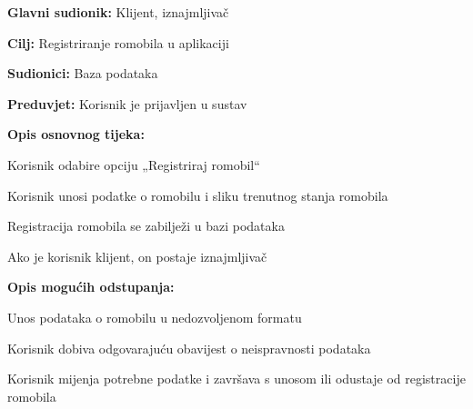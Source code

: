 						\noindent {}
						\begin{packed_item}
							
							\item \textbf{Glavni sudionik: }Klijent, iznajmljivač
							\item  \textbf{Cilj: }Registriranje romobila u aplikaciji
							\item  \textbf{Sudionici: }Baza podataka
							\item  \textbf{Preduvjet: }Korisnik je prijavljen u sustav
							\item  \textbf{Opis osnovnog tijeka:}
							
							\item[] \begin{packed_enum}
								
								\item Korisnik odabire opciju „Registriraj romobil“ 
								\item Korisnik unosi podatke o romobilu i sliku trenutnog stanja romobila 
								\item Registracija romobila se zabilježi u bazi podataka 
								\item Ako je korisnik klijent, on postaje iznajmljivač   
							\end{packed_enum}
							
							\item  \textbf{Opis mogućih odstupanja:}
							
							\item[] \begin{packed_item}
								
								\item[2.a] Unos podataka o romobilu u nedozvoljenom formatu 
								\item[] \begin{packed_enum}
									
									\item Korisnik dobiva odgovarajuću obavijest o neispravnosti podataka 
									\item Korisnik mijenja potrebne podatke i završava s unosom ili odustaje od registracije romobila 
									
								\end{packed_enum}
								
								
							\end{packed_item}
						\end{packed_item}
						\noindent {}
